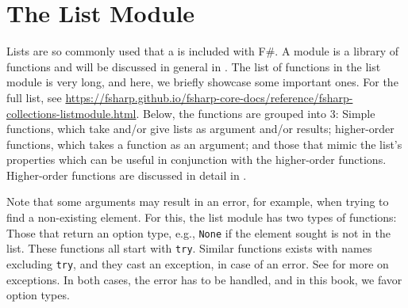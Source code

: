 \documentclass[fsharpNotes.tex]{subfiles}
\begin{document}
\section{The List Module}
\label{sec:listModule}
Lists are so commonly used that a  is included with F\#. A module is a library of functions and will be discussed in general in . The list of functions in the list module is very long, and here, we briefly showcase some important ones. For the full list, see \url{https://fsharp.github.io/fsharp-core-docs/reference/fsharp-collections-listmodule.html}. Below, the functions are grouped into 3: Simple functions, which take and/or give lists as argument and/or results; higher-order functions, which takes a function as an argument; and those that mimic the list's properties which can be useful in conjunction with the higher-order functions. Higher-order functions are discussed in detail in .

Note that some arguments may result in an error, for example, when trying to find a non-existing element. For this, the list module has two types of functions: Those that return an option type, e.g., \lstinline{None} if the element sought is not in the list. These functions all start with \texttt{try}. Similar functions exists with names excluding \texttt{try}, and they cast an exception, in case of an error. See  for more on exceptions. In both cases, the error has to be handled, and in this book, we favor option types.
\end{document}
